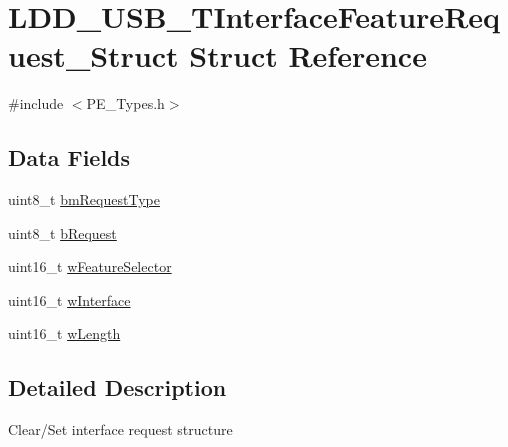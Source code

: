 \hypertarget{struct_l_d_d___u_s_b___t_interface_feature_request___struct}{\section{L\-D\-D\-\_\-\-U\-S\-B\-\_\-\-T\-Interface\-Feature\-Request\-\_\-\-Struct Struct Reference}
\label{struct_l_d_d___u_s_b___t_interface_feature_request___struct}
}


{\ttfamily \#include $<$P\-E\-\_\-\-Types.\-h$>$}

\subsection*{Data Fields}
\begin{DoxyCompactItemize}
\item 
uint8\-\_\-t \hyperlink{struct_l_d_d___u_s_b___t_interface_feature_request___struct_a72b3bba6305033e1951402155005aa7d}{bm\-Request\-Type}
\item 
uint8\-\_\-t \hyperlink{struct_l_d_d___u_s_b___t_interface_feature_request___struct_a5e8ab52b3b2c853ee77a5e2207aaf01b}{b\-Request}
\item 
uint16\-\_\-t \hyperlink{struct_l_d_d___u_s_b___t_interface_feature_request___struct_aa1c03cac467205263f3f973f580dca11}{w\-Feature\-Selector}
\item 
uint16\-\_\-t \hyperlink{struct_l_d_d___u_s_b___t_interface_feature_request___struct_afc1da433b4a02f8c6a6ed6ce8b3065da}{w\-Interface}
\item 
uint16\-\_\-t \hyperlink{struct_l_d_d___u_s_b___t_interface_feature_request___struct_a5f54f1e83024342d9d63aad374a117ba}{w\-Length}
\end{DoxyCompactItemize}


\subsection{Detailed Description}
Clear/\-Set interface request structure 

